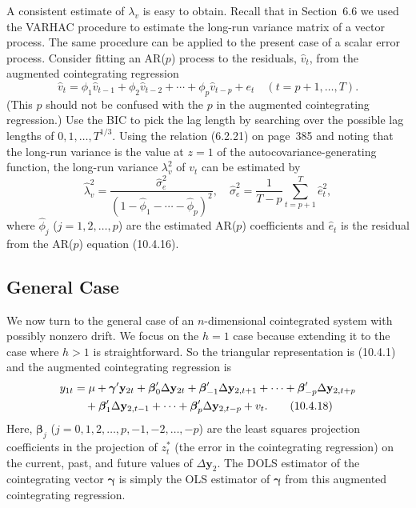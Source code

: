 A consistent estimate of $\lambda_v$ is easy to obtain. Recall that in Section~6.6 we
used the VARHAC procedure to estimate the long-run variance matrix of a vector
process. The same procedure can be applied to the present case of a scalar error
process. Consider fitting an AR($p$) process to the residuals, $\hat{v}_t$, from the augmented
cointegrating regression
\begin{equation}
  \hat{v}_t = \phi_1 \hat{v}_{t-1} + \phi_2 \hat{v}_{t-2}
    + \cdots + \phi_p \hat{v}_{t-p} + e_t
  \quad (t = p + 1, \ldots, T).
  \label{eq:10.4.16} \tag{10.4.16}
\end{equation}
(This $p$ should not be confused with the $p$ in the augmented cointegrating regres\-sion.)
Use the BIC to pick the lag length by searching over the possible lag lengths
of $0, 1, \ldots, T^{1/3}$. Using the relation (6.2.21) on page~385 and noting that the long-run
variance is the value at $z = 1$ of the autocovariance-generating function, the
long-run variance $\lambda_v^2$ of $v_t$ can be estimated by
\begin{equation}
  \hat{\lambda}_v^2
  = \frac{\hat{\sigma}_e^2}{(1 - \hat{\phi}_1 - \cdots - \hat{\phi}_p)^2}, \quad
  \hat{\sigma}_e^2
  = \frac{1}{T - p} \sum_{t=p+1}^{T} \hat{e}_t^2,
  \label{eq:10.4.17} \tag{10.4.17}
\end{equation}
where $\hat{\phi}_j$ ($j = 1, 2, \ldots, p$) are the estimated AR($p$) coefficients and $\hat{e}_t$ is the
residual from the AR($p$) equation (10.4.16).

\subsection*{General Case}

We now turn to the general case of an $n$-dimensional cointegrated system with
possibly nonzero drift. We focus on the $h = 1$ case because extending it to the case
where $h > 1$ is straightforward. So the triangular representation is (10.4.1) and the
augmented cointegrating regression is
\begin{align}
  y_{1t}
  &= \mu + \boldsymbol{\gamma}' \mathbf{y}_{2t}
    + \boldsymbol{\beta}_0' \Delta \mathbf{y}_{2t}
    + \boldsymbol{\beta}_{-1}' \Delta \mathbf{y}_{2,t+1} + \cdots
    + \boldsymbol{\beta}_{-p}' \Delta \mathbf{y}_{2,t+p}
  \notag \\
  &\quad + \boldsymbol{\beta}_1' \Delta \mathbf{y}_{2,t-1} + \cdots
    + \boldsymbol{\beta}_p' \Delta \mathbf{y}_{2,t-p} + v_t.
  \label{eq:10.4.18} \tag{10.4.18}
\end{align}
Here, $\boldsymbol{\beta}_j$ ($j = 0, 1, 2, \ldots, p, -1, -2, \ldots, -p$) are the least squares projection
coefficients in the projection of $z_t^*$ (the error in the cointegrating regression) on the
current, past, and future values of $\Delta\mathbf{y}_2$. The DOLS estimator of the cointegrating
vector $\boldsymbol{\gamma}$ is simply the OLS estimator of $\boldsymbol{\gamma}$ from this augmented cointegrating
regression.

